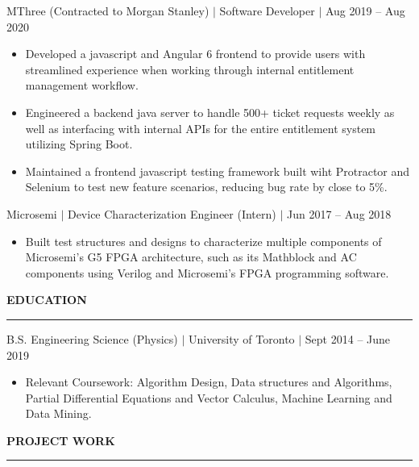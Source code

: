 \documentclass[12pt]{article}
\newcommand{\sectionRule}{\textcolor{gray}{\rule{7.27in}{0.02cm}}}
\newcommand{\sectionTxt}[1]{\noindent\textbf{#1}\\}
\newcommand{\textDate}[3]{\noindent#1 $|$ #2 $|$ {\color{textGray} #3}}
\begin{document}
    \textDate{MThree (Contracted to Morgan Stanley)}{Software Developer}{Aug 2019 -- Aug 2020}
    \begin{small}
        \begin{itemize}
            \itemsep0em 
            \item {\color{textGray} Developed a javascript and Angular 6 frontend to provide users with streamlined experience when working through internal entitlement management workflow.}
            \item {\color{textGray} Engineered a backend java server to handle 500+ ticket requests weekly as well as interfacing with internal APIs for the entire entitlement system utilizing Spring Boot.}
            \item {\color{textGray} Maintained a frontend javascript testing framework built wiht Protractor and Selenium to test new feature scenarios, reducing bug rate by close to 5\%.}
        \end{itemize}
    \end{small}

    \textDate{Microsemi}{Device Characterization Engineer (Intern)}{Jun 2017 -- Aug 2018}
    \begin{small}
        \begin{itemize}
            \itemsep0em 
            \item {\color{textGray} Built test structures and designs to characterize multiple components of Microsemi's G5 FPGA architecture, such as its Mathblock and AC components using Verilog and Microsemi's FPGA programming software.}
        \end{itemize}
    \end{small}

    \sectionTxt{EDUCATION}
    \sectionRule

    \textDate{B.S. Engineering Science (Physics)}{University of Toronto}{Sept 2014 -- June 2019}
    \begin{small}
        \begin{itemize}
            \itemsep0em 
            \item Relevant Coursework: {\color{textGray} Algorithm Design, Data structures and Algorithms, Partial Differential Equations and Vector Calculus, Machine Learning and Data Mining.}
        \end{itemize}
    \end{small}

    \sectionTxt{PROJECT WORK}
    \sectionRule
\end{document}
